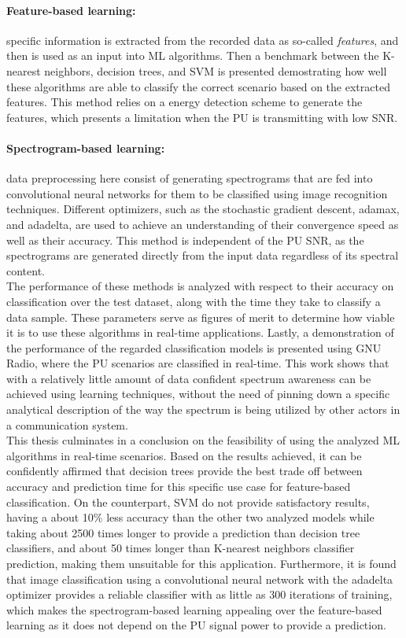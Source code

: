 \paragraph*{Feature-based learning:} specific information is extracted from the recorded data as so-called \emph{features}, and then is used as an input into \ac{ML} algorithms. Then a benchmark between the K-nearest neighbors, decision trees, and \ac{SVM} is presented demostrating how well these algorithms are able to classify the correct scenario based on the extracted features. This method relies on a energy detection scheme to generate the features, which presents a limitation when the \ac{PU} is transmitting with low SNR.
\paragraph*{Spectrogram-based learning:} data preprocessing here consist of generating spectrograms that are fed into convolutional neural networks for them to be classified using image recognition techniques. Different optimizers, such as the stochastic gradient descent, adamax, and adadelta, are used to achieve an understanding of their convergence speed as well as their accuracy. This method is independent of the \ac{PU} SNR, as the spectrograms are generated directly from the input data regardless of its spectral content.\\

The performance of these methods is analyzed with respect to their accuracy on classification over the test dataset, along with the time they take to classify a data sample. These parameters serve as figures of merit to determine how viable it is to use these algorithms in real-time applications. Lastly, a demonstration of the performance of the regarded classification models is presented using GNU Radio, where the \ac{PU} scenarios are classified in real-time. This work shows that with a relatively little amount of data confident spectrum awareness can be achieved using learning techniques, without the need of pinning down a specific analytical description of the way the spectrum is being utilized by other actors in a communication system.\\

This thesis culminates in a conclusion on the feasibility of using the analyzed \ac{ML} algorithms in real-time scenarios. Based on the results achieved, it can be confidently affirmed that decision trees provide the best trade off between accuracy and prediction time for this specific use case for feature-based classification. On the counterpart, \ac{SVM} do not provide satisfactory results, having a about 10\% less accuracy than the other two analyzed models while taking about 2500 times longer to provide a prediction than decision tree classifiers, and about 50 times longer than K-nearest neighbors classifier prediction, making them unsuitable for this application. Furthermore, it is found that image classification using a convolutional neural network with the adadelta optimizer provides a reliable classifier with as little as 300 iterations of training, which makes the spectrogram-based learning appealing over the feature-based learning as it does not depend on the \ac{PU} signal power to provide a prediction.
